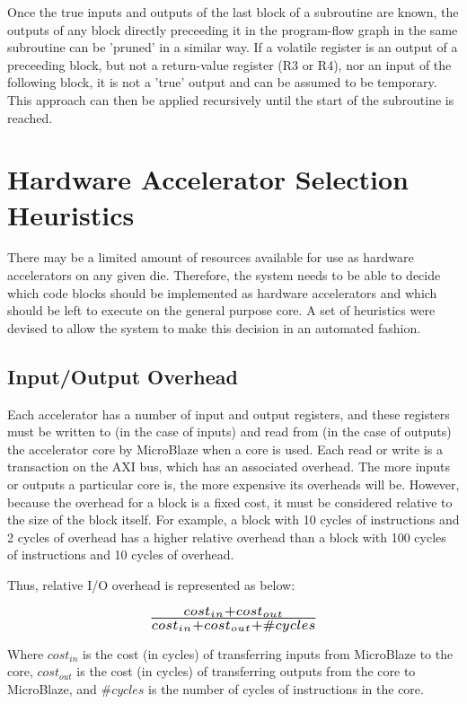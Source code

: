 \documentclass{UoYCSproject}
\begin{document}
Once the true inputs and outputs of the last block of a subroutine are known, the outputs of any block directly preceeding it in
the program-flow graph in the same subroutine can be 'pruned' in a similar way. If a volatile register is an output of a
preceeding block, but not a return-value register (R3 or R4), nor an input of the following block, it is not a 'true' output and
can be assumed to be temporary. This approach can then be applied recursively until the start of the subroutine is reached.

\section{Hardware Accelerator Selection Heuristics}

There may be a limited amount of resources available for use as hardware accelerators on any given die. Therefore,
the system needs to be able to decide which code blocks should be implemented as hardware accelerators and which
should be left to execute on the general purpose core. A set of heuristics were devised to allow
the system to make this decision in an automated fashion.

\subsection{Input/Output Overhead}

Each accelerator has a number of input and output registers, and these registers must be written to (in the case of inputs)
and read from (in the case of outputs) the accelerator core by MicroBlaze when a core is used. Each read or write is a transaction
on the AXI bus, which has an associated overhead. The more inputs or outputs a particular core is, the more expensive its
overheads will be. However, because the overhead for a block is a fixed cost, it must be considered relative to the size of the
block itself. For example, a block with 10 cycles of instructions and 2 cycles of overhead has a higher relative overhead
than a block with 100 cycles of instructions and 10 cycles of overhead.

Thus, relative I/O overhead is represented as below:

\begin{equation}
\scalebox{1.5}{$\frac{cost_{in} + cost_{out}}{cost_{in} + cost_{out} + \#cycles}$}
\end{equation}

Where \(cost_{in}\) is the cost (in cycles) of transferring inputs from MicroBlaze to the core, \(cost_{out}\) is the cost
(in cycles) of transferring outputs from the core to MicroBlaze, and \(\#cycles\) is the number of cycles of instructions in the
core.
\end{document}
